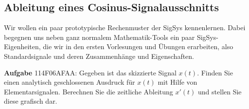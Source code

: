 \subsection{Ableitung eines Cosinus-Signalausschnitts}
\label{sec:114F06AFAA}
\begin{Ziel}
Wir wollen ein paar prototypische
Rechenmuster der SigSys kennenlernen. Dabei begegnen uns neben ganz normalem
Mathematik-Tools ein paar SigSys-Eigenheiten, die wir in den ersten Vorlesungen und Übungen
erarbeiten, also Standardsignale und deren Zusammenhänge und Eigenschaften.
\end{Ziel}
\textbf{Aufgabe} {\tiny 114F06AFAA}:
Gegeben ist das skizzierte Signal $x(t)$. Finden Sie einen analytisch geschlossenen
Ausdruck für $x(t)$ mit Hilfe von Elementarsignalen. Berechnen Sie die zeitliche
Ableitung $x'(t)$ und stellen Sie diese grafisch dar.
\begin{center}
\end{center}

